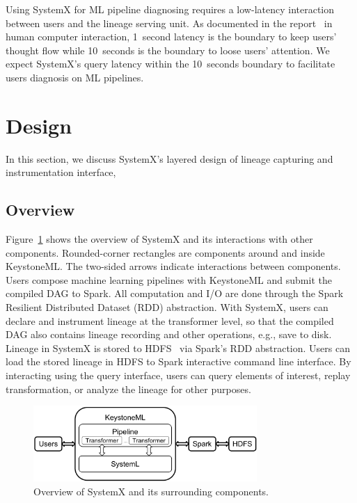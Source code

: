 \documentclass{sig-alternate}
\begin{document}
Using SystemX for ML pipeline diagnosing requires a low-latency interaction between users and the lineage serving unit.
As documented in the report~\cite{nielsen2009} in human computer interaction, 1~second latency is the boundary to keep users' thought flow while 10~seconds
is the boundary to loose users' attention.
We expect SystemX's query latency within the 10~seconds boundary to facilitate users diagnosis on ML pipelines.

\section{Design}
\label{sec:Design}
In this section, we discuss SystemX's layered design of lineage capturing and instrumentation interface, 

\subsection{Overview}
Figure~\ref{fig:architecture} shows the overview of SystemX and its interactions with other components. 
Rounded-corner rectangles are components around and inside KeystoneML. 
The two-sided arrows indicate interactions between components.
Users compose machine learning pipelines with KeystoneML and submit the compiled DAG to Spark.
All computation and I/O are done through the Spark Resilient Distributed Dataset (RDD) abstraction.
With SystemX, users can declare and instrument lineage at the transformer level, 
so that the compiled DAG also contains lineage recording and other operations, e.g., save to disk.
Lineage in SystemX is stored to HDFS~\cite{shvachko10} via Spark's RDD abstraction.
Users can load the stored lineage in HDFS to Spark interactive command line interface.
By interacting using the query interface, users can query elements of interest, replay transformation, or analyze
the lineage for other purposes.

\begin{figure}[h]
\begin{center}
    \includegraphics[width=85mm]{pictures/architecture}
\caption {Overview of SystemX and its surrounding components.
    \label{fig:architecture}
}
\end{center}
\end{figure}
\end{document}

